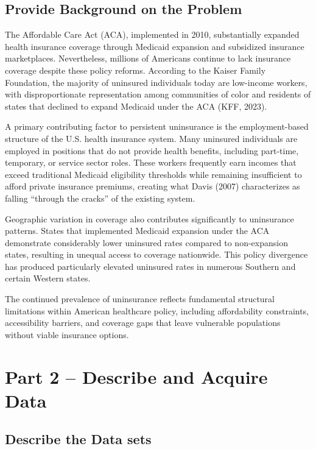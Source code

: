 \documentclass[
]{article}
\begin{document}
\subsection{Provide Background on the
Problem}\label{provide-background-on-the-problem}

The Affordable Care Act (ACA), implemented in 2010, substantially
expanded health insurance coverage through Medicaid expansion and
subsidized insurance marketplaces. Nevertheless, millions of Americans
continue to lack insurance coverage despite these policy reforms.
According to the Kaiser Family Foundation, the majority of uninsured
individuals today are low-income workers, with disproportionate
representation among communities of color and residents of states that
declined to expand Medicaid under the ACA (KFF, 2023).

A primary contributing factor to persistent uninsurance is the
employment-based structure of the U.S. health insurance system. Many
uninsured individuals are employed in positions that do not provide
health benefits, including part-time, temporary, or service sector
roles. These workers frequently earn incomes that exceed traditional
Medicaid eligibility thresholds while remaining insufficient to afford
private insurance premiums, creating what Davis (2007) characterizes as
falling ``through the cracks'' of the existing system.

Geographic variation in coverage also contributes significantly to
uninsurance patterns. States that implemented Medicaid expansion under
the ACA demonstrate considerably lower uninsured rates compared to
non-expansion states, resulting in unequal access to coverage
nationwide. This policy divergence has produced particularly elevated
uninsured rates in numerous Southern and certain Western states.

The continued prevalence of uninsurance reflects fundamental structural
limitations within American healthcare policy, including affordability
constraints, accessibility barriers, and coverage gaps that leave
vulnerable populations without viable insurance options.

\section{Part 2 -- Describe and Acquire
Data}\label{part-2-describe-and-acquire-data}

\subsection{Describe the Data sets}\label{describe-the-data-sets}
\end{document}
